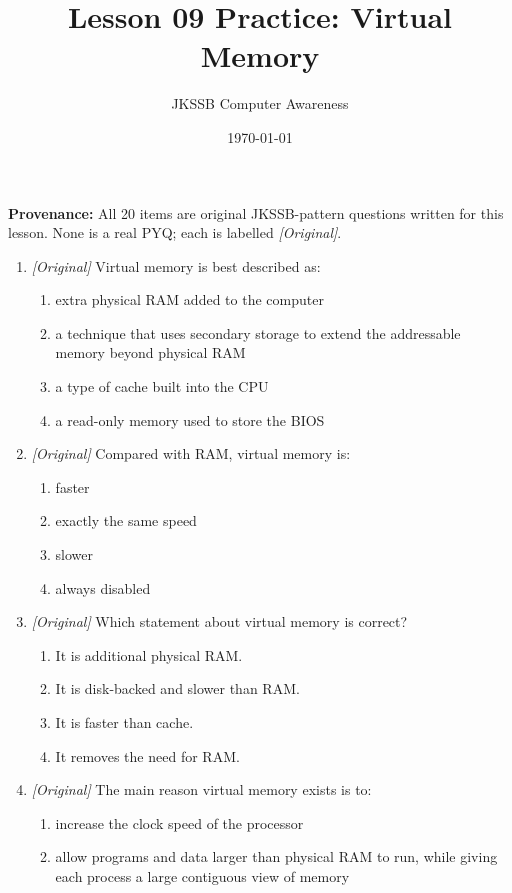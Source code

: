 \documentclass[11pt]{article}
\title{Lesson 09 Practice: Virtual Memory}
\author{JKSSB Computer Awareness}
\date{\today}
\begin{document}
\maketitle
\noindent\textbf{Provenance:} All 20 items are original JKSSB-pattern
questions written for this lesson. None is a real PYQ; each is labelled
\textit{[Original]}.

\begin{enumerate}[label=\textbf{Q\arabic*.}, leftmargin=*]
\item \textit{[Original]} Virtual memory is best described as:
  \begin{enumerate}[label=\Alph*.]
    \item extra physical RAM added to the computer
    \item a technique that uses secondary storage to extend the addressable
      memory beyond physical RAM
    \item a type of cache built into the CPU
    \item a read-only memory used to store the BIOS
  \end{enumerate}
\item \textit{[Original]} Compared with RAM, virtual memory is:
  \begin{enumerate}[label=\Alph*.]
    \item faster
    \item exactly the same speed
    \item slower
    \item always disabled
  \end{enumerate}
\item \textit{[Original]} Which statement about virtual memory is correct?
  \begin{enumerate}[label=\Alph*.]
    \item It is additional physical RAM.
    \item It is disk-backed and slower than RAM.
    \item It is faster than cache.
    \item It removes the need for RAM.
  \end{enumerate}
\item \textit{[Original]} The main reason virtual memory exists is to:
  \begin{enumerate}[label=\Alph*.]
    \item increase the clock speed of the processor
    \item allow programs and data larger than physical RAM to run, while
      giving each process a large contiguous view of memory

\end{enumerate}
\end{enumerate}
\end{document}
